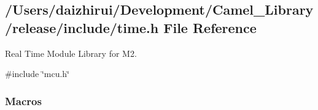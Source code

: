 \hypertarget{a00053}{}\subsection{/\+Users/daizhirui/\+Development/\+Camel\+\_\+\+Library/release/include/time.h File Reference}
\label{a00053}


Real Time Module Library for M2.  


{\ttfamily \#include \char`\"{}mcu.\+h\char`\"{}}\newline
\subsubsection*{Macros}
